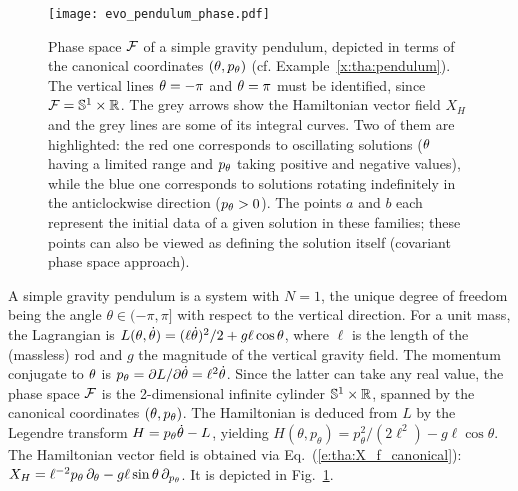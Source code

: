 \begin{figure}
\centerline{\texttt{[image: evo\_pendulum\_phase.pdf]}}
\caption[]{\label{f:tha:pendulum_phase} \footnotesize
Phase space $\mathcal{F}$ of a simple gravity pendulum, depicted in terms of the
canonical coordinates $(\theta,p_\theta)$ (cf. Example~\ref{x:tha:pendulum}).
The vertical lines $\theta=-\pi$ and $\theta=\pi$ must be identified,
since $\mathcal{F} = \mathbb{S}^1 \times \mathbb{R}$.
The grey arrows show the Hamiltonian vector field $X_H$ and the grey
lines are some of its integral curves. Two of them are highlighted: the red
one corresponds to oscillating solutions ($\theta$ having a limited range and $p_\theta$ taking positive and negative values), while the blue one corresponds to solutions
rotating indefinitely in the anticlockwise direction ($p_\theta>0$).
The points $a$ and $b$ each represent the initial data of a
given solution in these families; these points can also be viewed as defining
the solution itself (covariant phase space approach).}
\end{figure}

\begin{example}
\label{x:tha:pendulum}
A simple gravity pendulum is a system with $N=1$, the unique degree of
freedom being the angle $\theta\in(-\pi,\pi]$ with respect to the vertical direction.
For a unit mass, the Lagrangian is
$L(\theta,\dot{\theta}) = (\ell\dot{\theta})^2/2 + g \ell \cos\theta$,
where $\ell$ is the length of the (massless) rod and $g$
the magnitude of the vertical gravity field. The momentum conjugate to $\theta$
is $p_\theta = {\partial L}/{\partial \dot{\theta}} = \ell^2\dot{\theta}$. Since the latter can
take any real value, the phase space $\mathcal{F}$ is the 2-dimensional infinite cylinder
$\mathbb{S}^1 \times \mathbb{R}$,
spanned by the canonical coordinates $(\theta,p_\theta)$. The
Hamiltonian is deduced from $L$ by the Legendre transform $H = p_\theta \dot{\theta} - L$,
yielding
$H(\theta,p_\theta) = p_\theta^2 / (2\ell^2) - g\ell\cos\theta$.
The Hamiltonian vector field is obtained via Eq.~(\ref{e:tha:X_f_canonical}):
$X_H = \ell^{-2} p_\theta \, \partial_\theta - g \ell \sin\theta \, \partial_{p_\theta}$.
It is depicted in Fig.~\ref{f:tha:pendulum_phase}.
\end{example}


